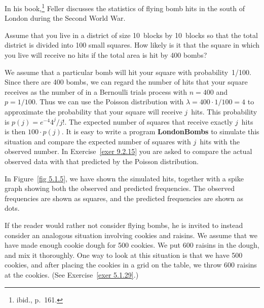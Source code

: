\begin{example}\label{exam 5.5} In his book,\footnote{ibid., p.~161.} Feller
discusses the statistics of flying bomb hits in the south of London during
the Second World War.
\par
Assume that you live in a district of size 10~blocks by 10~blocks so that the total
district is divided into 100 small squares.  How likely is it that the square in which
you live will receive no hits if the total area is hit by 400 bombs?
\par
We assume that a particular bomb will hit your square with probability~1/100.  Since
there are 400 bombs, we can regard the number of hits that your square receives as the
number of   in a Bernoulli trials process with
$n = 400$ and $p = 1/100$.  Thus we can use the Poisson distribution with $\lambda = 400
\cdot 1/100 = 4$ to approximate the probability that your square will receive
$j$~hits.  This probability is $p(j) = e^{-4} 4^j/j!$.  The expected number of squares
that receive exactly $j$~hits is then $100 \cdot p(j)$.  It is easy to write a program
{\bf LondonBombs} to simulate this situation and compare the expected number of
squares with $j$~hits with the observed number.  In Exercise~\ref{exer 9.2.15} you are
asked to compare the actual observed data with that predicted by the Poisson
distribution.
\par
In Figure~\ref{fig 5.1.5}, we have shown the simulated hits, together with a spike graph
showing both the observed and predicted frequencies.  The observed frequencies are shown 
as squares, and the predicted frequencies are shown as dots.
\end{example} 
If the reader would rather not consider flying bombs, he is invited to
instead consider an analogous situation involving cookies and raisins.  We assume that
we have made enough cookie dough for 500 cookies.  We put 600 raisins in the dough,
and mix it thoroughly.  One way to look at this situation is that we have 500 cookies,
and after placing the cookies in a grid on the table, we throw 600 raisins at the
cookies. (See Exercise~\ref{exer 5.1.29}.)
